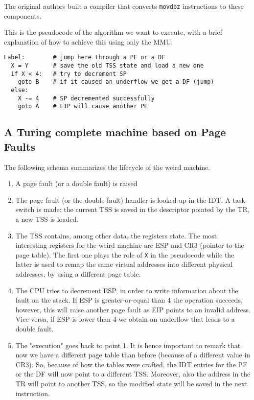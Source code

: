 \documentclass[11pt,twoside,a4paper]{article}
\begin{document}
The original authors built a compiler that converts \texttt{movdbz} instructions to these components. \cite{trapcc}

This is the pseudocode of the algorithm we want to execute, with a brief explanation of how to achieve this using only the MMU:
\begin{lstlisting}
Label:        # jump here through a PF or a DF
  X = Y       # save the old TSS state and load a new one
  if X < 4:   # try to decrement SP
    goto B    # if it caused an underflow we get a DF (jump)
  else:
    X -= 4    # SP decremented successfully
    goto A    # EIP will cause another PF
\end{lstlisting}


\subsection{A Turing complete machine based on Page Faults}

The following schema summarizes the lifecycle of the weird machine.

\begin{enumerate}
\item A page fault (or a double fault) is raised
\item The page fault (or the double fault) handler is looked-up in the IDT. A task switch is made: the current TSS is saved in the descriptor pointed by the TR, a new TSS is loaded.
\item The TSS contains, among other data, the registers state. The most interesting registers for the weird machine are ESP and CR3 (pointer to the page table). The first one plays the role of \texttt{X} in the pseudocode while the latter is used to remap the same virtual addresses into different physical addresses, by using a different page table.
\item The CPU tries to decrement ESP, in order to write information about the fault on the stack. If ESP is greater-or-equal than 4 the operation succeeds, however, this will raise another page fault as EIP points to an invalid address. Vice-versa, if ESP is lower than 4 we obtain an underflow that leads to a double fault.
\item The "execution" goes back to point 1. It is hence important to remark that now we have a different page table than before (because of a different value in CR3). So, because of how the tables were crafted, the IDT entries for the PF or the DF will now point to a different TSS. Moreover, also the address in the TR will point to another TSS, so the modified state will be saved in the next instruction.
\end{enumerate}
\end{document}

